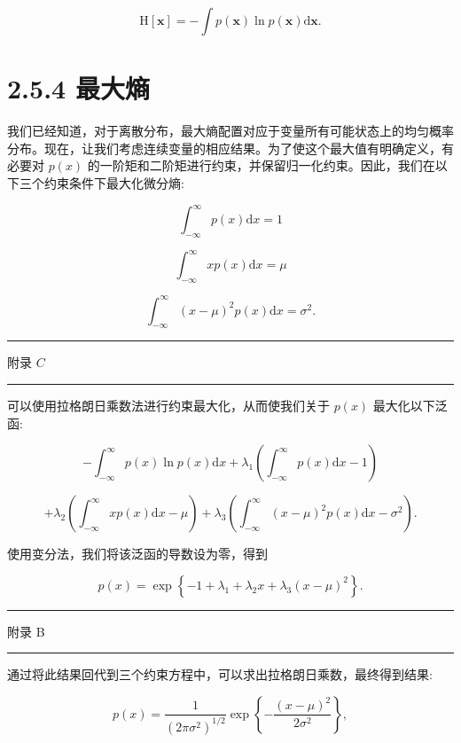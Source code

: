 \documentclass[10pt]{report}
\newcommand{\HRule}{\begin{center}\rule{0.9\linewidth}{0.2mm}\end{center}}
\begin{document}
\[
\mathrm{H}\left\lbrack  \mathbf{x}\right\rbrack   =  - \int p\left( \mathbf{x}\right) \ln p\left( \mathbf{x}\right) \mathrm{d}\mathbf{x}. \tag{2.92}
\]

\section*{2.5.4 最大熵}

我们已经知道，对于离散分布，最大熵配置对应于变量所有可能状态上的均匀概率分布。现在，让我们考虑连续变量的相应结果。为了使这个最大值有明确定义，有必要对 \(p\left( x\right)\) 的一阶矩和二阶矩进行约束，并保留归一化约束。因此，我们在以下三个约束条件下最大化微分熵:

\[
{\int }_{-\infty }^{\infty }p\left( x\right) \mathrm{d}x = 1 \tag{2.93}
\]

\[
{\int }_{-\infty }^{\infty }{xp}\left( x\right) \mathrm{d}x = \mu  \tag{2.94}
\]

\[
{\int }_{-\infty }^{\infty }{\left( x - \mu \right) }^{2}p\left( x\right) \mathrm{d}x = {\sigma }^{2}. \tag{2.95}
\]

\HRule

附录 \(C\)

\HRule

可以使用拉格朗日乘数法进行约束最大化，从而使我们关于 \(p\left( x\right)\) 最大化以下泛函:

\[
- {\int }_{-\infty }^{\infty }p\left( x\right) \ln p\left( x\right) \mathrm{d}x + {\lambda }_{1}\left( {{\int }_{-\infty }^{\infty }p\left( x\right) \mathrm{d}x - 1}\right)
\]

\[
+ {\lambda }_{2}\left( {{\int }_{-\infty }^{\infty }{xp}\left( x\right) \mathrm{d}x - \mu }\right)  + {\lambda }_{3}\left( {{\int }_{-\infty }^{\infty }{\left( x - \mu \right) }^{2}p\left( x\right) \mathrm{d}x - {\sigma }^{2}}\right) . \tag{2.96}
\]

使用变分法，我们将该泛函的导数设为零，得到

\[
p\left( x\right)  = \exp \left\{  {-1 + {\lambda }_{1} + {\lambda }_{2}x + {\lambda }_{3}{\left( x - \mu \right) }^{2}}\right\}  . \tag{2.97}
\]

\HRule

附录 B

\HRule

通过将此结果回代到三个约束方程中，可以求出拉格朗日乘数，最终得到结果:

\[
p\left( x\right)  = \frac{1}{{\left( 2\pi {\sigma }^{2}\right) }^{1/2}}\exp \left\{  {-\frac{{\left( x - \mu \right) }^{2}}{2{\sigma }^{2}}}\right\}  , \tag{2.98}
\]
\end{document}
